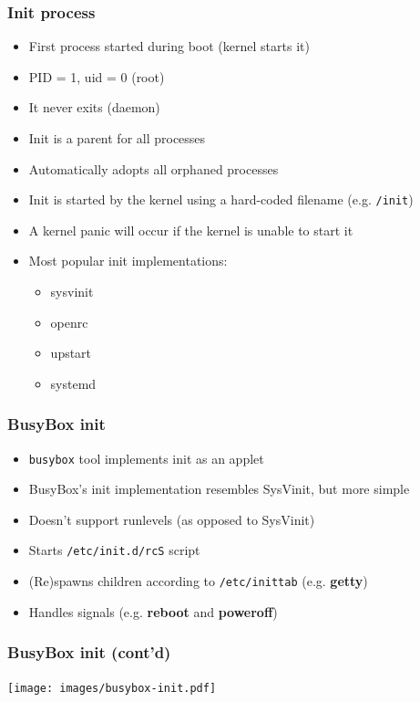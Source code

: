 \documentclass[aspectratio=169]{beamer}
\begin{document}
\begin{frame}
  \frametitle{Init process}
  \begin{itemize}
  \item First process started during boot (kernel starts it)
  \item PID = 1, uid = 0 (root)
  \item It never exits (daemon)
  \item Init is a parent for all processes
  \item Automatically adopts all orphaned processes
  \item Init is started by the kernel using a hard-coded filename (e.g. \texttt{/init})
  \item A kernel panic will occur if the kernel is unable to start it
  \item Most popular init implementations:
    \begin{itemize}
    \item sysvinit
    \item openrc
    \item upstart
    \item systemd
    \end{itemize}
  \end{itemize}
  \vspace*{-5mm}
\end{frame}

\begin{frame}
  \frametitle{BusyBox init}
  \begin{itemize}
  \item \texttt{busybox} tool implements init as an applet
  \item BusyBox's init implementation resembles SysVinit, but more simple
  \item Doesn't support runlevels (as opposed to SysVinit)
  \item Starts \texttt{/etc/init.d/rcS} script
  \item (Re)spawns children according to \texttt{/etc/inittab} (e.g. \textbf{getty})
  \item Handles signals (e.g. \textbf{reboot} and \textbf{poweroff})
  \end{itemize}
\end{frame}

\begin{frame}
  \frametitle{BusyBox init (cont'd)}
  \vspace*{-3mm}
  \begin{center}
    \texttt{[image: images/busybox-init.pdf]}
  \end{center}
  \vspace*{-10mm}
\end{frame}
\end{document}
